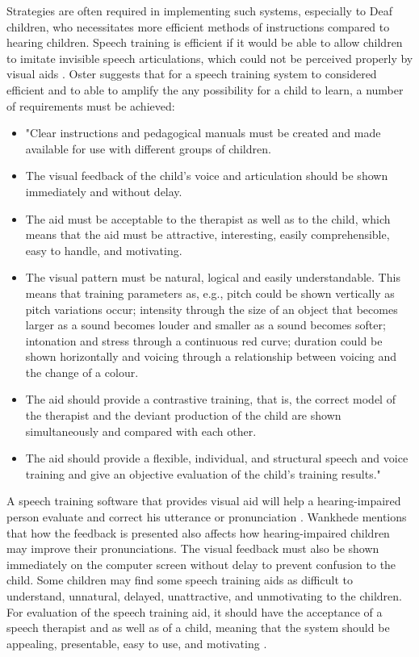 Strategies are often required in implementing such systems, especially to Deaf children, who necessitates more efficient methods of instructions compared to hearing children. Speech training is efficient if it would be able to allow children to imitate invisible speech articulations, which could not be perceived properly by visual aids \cite{oster:1996:cac}. Oster \citeyear{oster:1996:cac} suggests that for a speech training system to considered efficient and to able to amplify the any possibility for a child to learn, a number of requirements must be achieved:

\begin{itemize}
\item "Clear instructions and pedagogical manuals must be created and made available for use with different groups of children.
\item The visual feedback of the child’s voice and articulation should be shown immediately and without delay.
\item The aid must be acceptable to the therapist as well as to the child, which means that the aid must be attractive, interesting, easily comprehensible, easy to handle, and motivating.
\item The visual pattern must be natural, logical and easily understandable. This means that training parameters as, e.g., pitch could be shown vertically as pitch variations occur; intensity through the size of an object that becomes larger as a sound becomes louder and smaller as a sound becomes softer; intonation and stress through a continuous red curve; duration could be shown horizontally and voicing through a relationship between voicing and the change of a colour.
\item The aid should provide a contrastive training, that is, the correct model of the therapist and the deviant production of the child are shown simultaneously and compared with each other.
\item The aid should provide a flexible, individual, and structural speech and voice training and give an objective evaluation of the child’s training results." \cite{oster:1996:cac}
\end{itemize}

A speech training software that provides visual aid will help a hearing-impaired person evaluate and correct his utterance or pronunciation \cite{wankhede:2014:dvs}. Wankhede mentions that how the feedback is presented also affects how hearing-impaired children may improve their pronunciations. The visual feedback must also be shown immediately on the computer screen without delay to prevent confusion to the child. Some children may find some speech training aids as difficult to understand, unnatural, delayed, unattractive, and unmotivating to the children. For evaluation of the speech training aid, it should have the acceptance of a speech therapist and as well as of a child, meaning that the system should be appealing, presentable, easy to use, and motivating \cite{wankhede:2014:dvs}.

